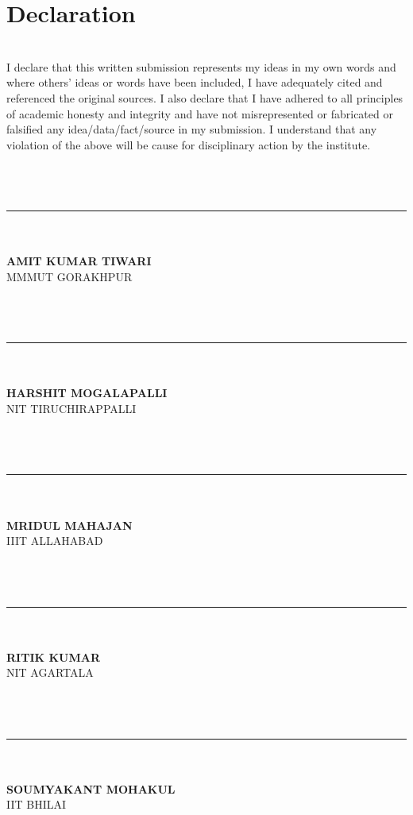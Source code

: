 \documentclass[12pt]{report}
\begin{document}
\section{Declaration}
\textbf{\\}
I declare that this written submission represents my ideas in my own words and where others’ ideas or words have been included, I have adequately cited and referenced the original sources. I also declare that I have adhered to all principles of academic honesty and integrity and have not misrepresented or fabricated or falsified any idea/data/fact/source in my submission. I understand that any violation of the above will be cause for disciplinary action by the institute.
\textbf{\\\\\\\\}
\begin{multicols}{2}
	\noindent\rule{5cm}{0.4pt}\\
	\textbf{\\AMIT KUMAR TIWARI} \\
	MMMUT GORAKHPUR\\
	\textbf{\\\\\\}
	\noindent\rule{5cm}{0.4pt}\\
	\textbf{\\HARSHIT MOGALAPALLI} \\
	NIT TIRUCHIRAPPALLI\\
	\textbf{\\\\\\}
	\noindent\rule{5cm}{0.4pt}\\
	\textbf{\\MRIDUL MAHAJAN} \\
	IIIT ALLAHABAD\\
	\textbf{\\\\\\}
	\columnbreak
	
	\noindent\rule{5cm}{0.4pt}\\
	\textbf{\\RITIK KUMAR} \\
	NIT AGARTALA\\
	\textbf{\\\\\\}
	\noindent\rule{5cm}{0.4pt}\\
	\textbf{\\SOUMYAKANT MOHAKUL} \\
	IIT BHILAI\\
	\textbf{\\\\}
\end{multicols}
\pagebreak
\end{document}
